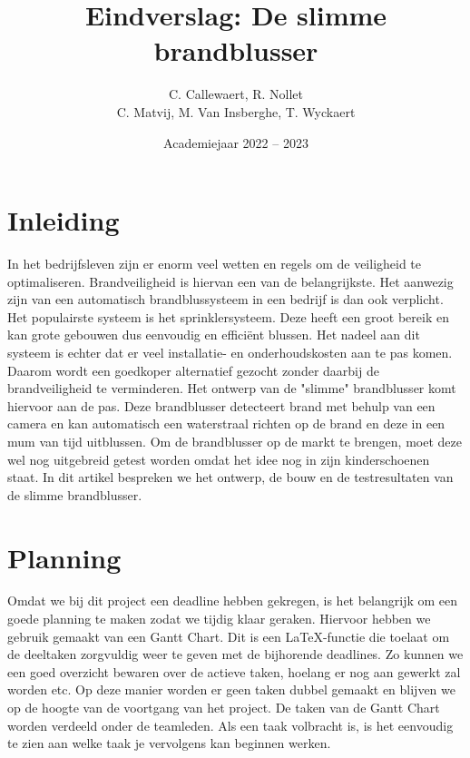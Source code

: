 \documentclass{kulakarticle}
\title{Eindverslag: De slimme brandblusser}
\author{C. Callewaert, R. Nollet \\
	 C. Matvij, M. Van Insberghe, T. Wyckaert }
\date{Academiejaar 2022 -- 2023}
\begin{document}
	
\maketitle

\tableofcontents

\pagebreak
 
\section*{Inleiding}

In het bedrijfsleven zijn er enorm veel wetten en regels om de veiligheid te optimaliseren. Brandveiligheid is hiervan een van de belangrijkste. Het aanwezig zijn van een automatisch brandblussysteem in een bedrijf is dan ook verplicht. Het populairste systeem is het sprinklersysteem. Deze heeft een groot bereik en kan grote gebouwen dus eenvoudig en efficiënt blussen. Het nadeel aan dit systeem is echter dat er veel installatie- en onderhoudskosten aan te pas komen. Daarom wordt een goedkoper alternatief gezocht zonder daarbij de brandveiligheid te verminderen. Het ontwerp van de "slimme" brandblusser komt hiervoor aan de pas. Deze brandblusser detecteert brand met behulp van een camera en kan automatisch een waterstraal richten op de brand en deze in een mum van tijd uitblussen. Om  de brandblusser op de markt te brengen, moet deze wel nog uitgebreid getest worden omdat het idee nog in zijn kinderschoenen staat. In dit artikel bespreken we het ontwerp, de bouw en de testresultaten van de slimme brandblusser. 


\section{Planning}

Omdat we bij dit project een deadline hebben gekregen, is het belangrijk om een goede planning te maken zodat we tijdig klaar geraken. Hiervoor hebben we gebruik gemaakt van een Gantt Chart. Dit is een \LaTeX-functie die toelaat om de deeltaken zorgvuldig weer te geven met de bijhorende deadlines. Zo kunnen we een goed overzicht bewaren over de actieve taken, hoelang er nog aan gewerkt zal worden etc. Op deze manier worden er geen taken dubbel gemaakt en blijven we op de hoogte van de voortgang van het project.  De taken van de Gantt Chart worden verdeeld onder de teamleden. Als een taak volbracht is, is het eenvoudig  te zien aan welke taak je vervolgens kan beginnen werken.
\end{document}
